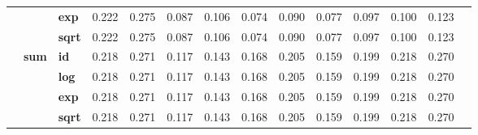 \begin{table}[t]
{\begin{tabular}{cclccccccccccc}
    & & \textbf{exp} & 0.222 & 0.275 & 0.087 & 0.106 & 0.074 & 0.090 & 0.077 & 0.097 & 0.100 & 0.123 \\
    & & \textbf{sqrt} & 0.222 & 0.275 & 0.087 & 0.106 & 0.074 & 0.090 & 0.077 & 0.097 & 0.100 & 0.123 \\
\cmidrule{2-13}
& \multirow{4}{*}{\textbf{sum}}
      & \textbf{id} & 0.218 & 0.271 & 0.117 & 0.143 & 0.168 & 0.205 & 0.159 & 0.199 & 0.218 & 0.270\\
    & & \textbf{log} & 0.218 & 0.271 & 0.117 & 0.143 & 0.168 & 0.205 & 0.159 & 0.199 & 0.218 & 0.270\\
    & & \textbf{exp} & 0.218 & 0.271 & 0.117 & 0.143 & 0.168 & 0.205 & 0.159 & 0.199 & 0.218 & 0.270\\
    & & \textbf{sqrt} & 0.218 & 0.271 & 0.117 & 0.143 & 0.168 & 0.205 & 0.159 & 0.199 & 0.218 & 0.270\\
      \midrule


\end{tabular}}
\end{table}

